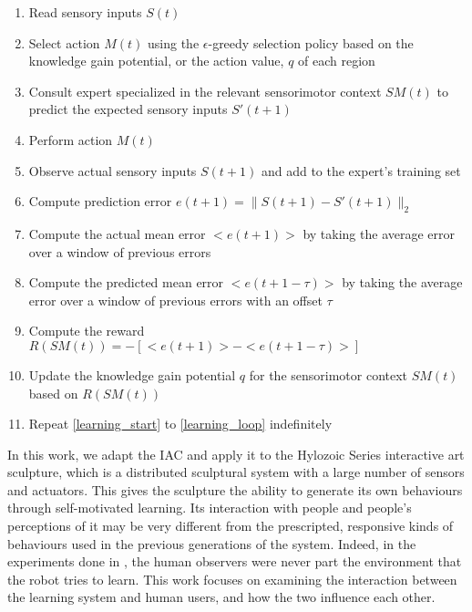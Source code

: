\begin{enumerate}
	\item \label{learning_start} Read sensory inputs $S(t)$
	\item Select action $M(t)$ using the $\epsilon$-greedy selection policy based on the knowledge gain potential, or the action value, $q$ of each region
	\item Consult expert specialized in the relevant sensorimotor context $SM(t)$ to predict the expected sensory inputs $S'(t+1)$
	\item Perform action $M(t)$
	\item Observe actual sensory inputs $S(t+1)$ and add to the expert's training set
	\item Compute prediction error $e(t+1) = \|S(t+1) - S'(t+1)\|_2$
	\item Compute the actual mean error $<e(t+1)>$ by taking the average error over a window of previous errors
	\item Compute the predicted mean error $<e(t+1-\tau)>$ by taking the average error over a window of previous errors with an offset $\tau$
	\item Compute the reward $R(SM(t)) = -[<e(t+1)> - <e(t+1-\tau)>]$
	\item Update the knowledge gain potential $q$ for the sensorimotor context $SM(t)$ based on $R(SM(t))$
	\item \label{learning_loop} Repeat \ref{learning_start} to \ref{learning_loop} indefinitely
\end{enumerate}

In this work, we adapt the IAC and apply it to the Hylozoic Series interactive art sculpture, which is a distributed sculptural system with a large number of sensors and actuators. This gives the sculpture the ability to generate its own behaviours through self-motivated learning. Its interaction with people and people's perceptions of it may be very different from the prescripted, responsive kinds of behaviours used in the previous generations of the system. Indeed, in the experiments done in \cite{Oudeyer2007}, the human observers were never part the environment that the robot tries to learn. This work focuses on examining the interaction between the learning system and human users, and how the two influence each other.

